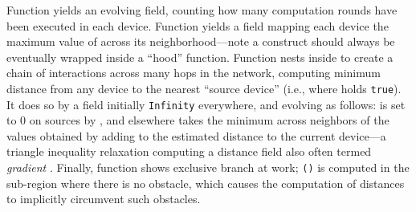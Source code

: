 \documentclass[12pt,a4paper,twoside,openright]{book}
\begin{document}
Function \texttt{} yields an evolving field, counting how many computation rounds have been executed in each device.
%
Function \texttt{} yields a field mapping each device the maximum value of \texttt{} across its neighborhood---note a \nbrK{} construct should always be eventually wrapped inside a ``hood'' function.
%
Function \texttt{} nests \nbrK{} inside \texttt{} to create a chain of interactions across many hops in the network, computing minimum distance from any device to the nearest ``source device'' (i.e., where \texttt{} holds \texttt{true}).
%
It does so by a field \texttt{} initially \texttt{Infinity} everywhere, and evolving as follows: \texttt{} is set to $0$ on sources by \texttt{}, and elsewhere takes the minimum across neighbors of the values obtained by adding to \texttt{} the estimated distance to the current device---a triangle inequality relaxation computing a distance field also often termed \emph{gradient} \cite{original-gradient,crf,VCMZ-TAAS2011}.
%
Finally, function \texttt{} shows exclusive branch at work; \texttt{()} is computed in the sub-region where there is no obstacle, which causes the computation of distances to implicitly circumvent such obstacles.
\end{document}
